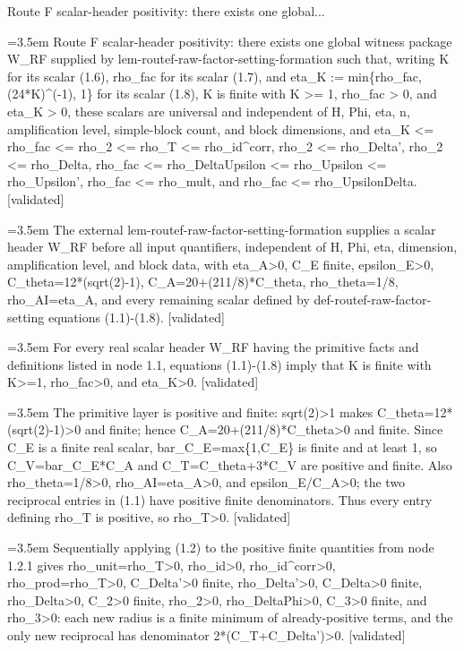\documentclass{article}
\newcommand{\step}[1]{\par\noindent\hangindent=3.5em\hangafter=1%
  \makebox[3.5em][l]{\textbf{#1.}}}
\newcommand{\steptag}[1]{\hfill{\small\textsf{[#1]}}}
\begin{document}
\begin{proofbox}{Route F scalar-header positivity: there exists one global...}
\step{1} Route F scalar-header positivity: there exists one global witness package W\_RF supplied by lem-routef-raw-factor-setting-formation such that, writing K for its scalar (1.6), rho\_fac for its scalar (1.7), and eta\_K := min\{rho\_fac, (24*K)\textasciicircum{}(-1), 1\} for its scalar (1.8), K is finite with K >= 1, rho\_fac > 0, and eta\_K > 0, these scalars are universal and independent of H, Phi, eta, n, amplification level, simple-block count, and block dimensions, and eta\_K <= rho\_fac <= rho\_2 <= rho\_T <= rho\_id\textasciicircum{}corr, rho\_2 <= rho\_Delta', rho\_2 <= rho\_Delta, rho\_fac <= rho\_DeltaUpsilon <= rho\_Upsilon <= rho\_Upsilon', rho\_fac <= rho\_mult, and rho\_fac <= rho\_UpsilonDelta. \steptag{validated} \\[6pt]
\step{1.1} The external lem-routef-raw-factor-setting-formation supplies a scalar header W\_RF before all input quantifiers, independent of H, Phi, eta, dimension, amplification level, and block data, with eta\_A>0, C\_E finite, epsilon\_E>0, C\_theta=12*(sqrt(2)-1), C\_A=20+(211/8)*C\_theta, rho\_theta=1/8, rho\_AI=eta\_A, and every remaining scalar defined by def-routef-raw-factor-setting equations (1.1)-(1.8). \steptag{validated} \\[4pt]
\step{1.2} For every real scalar header W\_RF having the primitive facts and definitions listed in node 1.1, equations (1.1)-(1.8) imply that K is finite with K>=1, rho\_fac>0, and eta\_K>0. \steptag{validated} \\[6pt]
\step{1.2.1} The primitive layer is positive and finite: sqrt(2)>1 makes C\_theta=12*(sqrt(2)-1)>0 and finite; hence C\_A=20+(211/8)*C\_theta>0 and finite. Since C\_E is a finite real scalar, bar\_C\_E=max\{1,C\_E\} is finite and at least 1, so C\_V=bar\_C\_E*C\_A and C\_T=C\_theta+3*C\_V are positive and finite. Also rho\_theta=1/8>0, rho\_AI=eta\_A>0, and epsilon\_E/C\_A>0; the two reciprocal entries in (1.1) have positive finite denominators. Thus every entry defining rho\_T is positive, so rho\_T>0. \steptag{validated} \\[4pt]
\step{1.2.2} Sequentially applying (1.2) to the positive finite quantities from node 1.2.1 gives rho\_unit=rho\_T>0, rho\_id>0, rho\_id\textasciicircum{}corr>0, rho\_prod=rho\_T>0, C\_Delta'>0 finite, rho\_Delta'>0, C\_Delta>0 finite, rho\_Delta>0, C\_2>0 finite, rho\_2>0, rho\_DeltaPhi>0, C\_3>0 finite, and rho\_3>0: each new radius is a finite minimum of already-positive terms, and the only new reciprocal has denominator 2*(C\_T+C\_Delta')>0. \steptag{validated} \\[4pt]

\end{proofbox}
\end{document}
